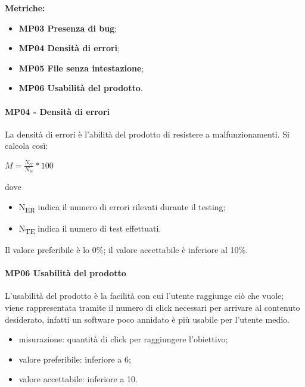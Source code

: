 \documentclass[../piano_di_qualifica.tex]{subfiles}
\begin{document}
\textbf{Metriche:}
\smallbreak
\begin{itemize}
	\item \textbf{MP03 Presenza di bug};
	\item \textbf{MP04 Densità di errori};
	\item \textbf{MP05 File senza intestazione};
	\item \textbf{MP06 Usabilità del prodotto}.
\end{itemize}


\paragraph{MP04 - Densità di errori}
La densità di errori è l'abilità del prodotto di resistere a malfunzionamenti. Si calcola così:\par

\begin{center}
	$M = \frac{N_{er}}{N_{te}} * 100$
\end{center}

dove
\smallbreak
\begin{itemize}
	\item N\textsubscript{ER} indica il numero di errori rilevati durante il testing;
	\item N\textsubscript{TE} indica il numero di test effettuati.
\end{itemize}

Il valore preferibile è lo 0\%; il valore accettabile è inferiore al 10\%.

\paragraph{MP06 Usabilità del prodotto}
L'usabilità del prodotto è la facilità con cui l’utente raggiunge ciò che vuole; viene rappresentata tramite il numero di click necessari per arrivare al contenuto desiderato, infatti un software poco annidato è più usabile per l'utente medio.
\smallbreak
\begin{itemize}
	\item misurazione: quantità di click per raggiungere l'obiettivo;
	\item valore preferibile: inferiore a 6;
	\item valore accettabile: inferiore a 10.
\end{itemize}
\end{document}
